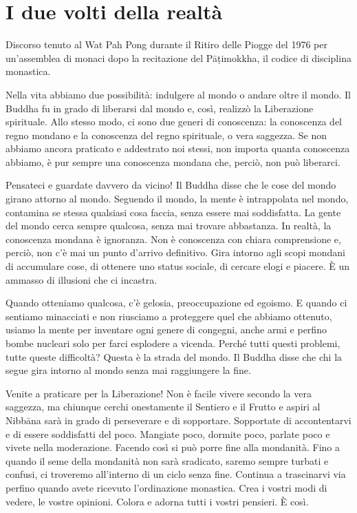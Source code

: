 \chapter{I due volti della realtà}

\begin{openingQuote}
  \centering

  Discorso tenuto al Wat Pah Pong durante il Ritiro delle Piogge del 1976 per
  un'assemblea di monaci dopo la recitazione del Pāṭimokkha, il codice di
  disciplina monastica.
\end{openingQuote}

Nella vita abbiamo due possibilità: indulgere al mondo o andare oltre il
mondo. Il Buddha fu in grado di liberarsi dal mondo e, così, realizzò la
Liberazione spirituale. Allo stesso modo, ci sono due generi di
conoscenza: la conoscenza del regno mondano e la conoscenza del regno
spirituale, o vera saggezza. Se non abbiamo ancora praticato e
addestrato noi stessi, non importa quanta conoscenza abbiamo, è pur
sempre una conoscenza mondana che, perciò, non può liberarci.

Pensateci e guardate davvero da vicino! Il Buddha disse che le cose del
mondo girano attorno al mondo. Seguendo il mondo, la mente è
intrappolata nel mondo, contamina se stessa qualsiasi cosa faccia, senza
essere mai soddisfatta. La gente del mondo cerca sempre qualcosa, senza
mai trovare abbastanza. In realtà, la conoscenza mondana è ignoranza.
Non è conoscenza con chiara comprensione e, perciò, non c'è mai un punto
d'arrivo definitivo. Gira intorno agli scopi mondani di accumulare cose,
di ottenere uno status sociale, di cercare elogi e piacere. È un ammasso
di illusioni che ci incastra.

Quando otteniamo qualcosa, c'è gelosia, preoccupazione ed egoismo. E
quando ci sentiamo minacciati e non riusciamo a proteggere quel che
abbiamo ottenuto, usiamo la mente per inventare ogni genere di congegni,
anche armi e perfino bombe nucleari solo per farci esplodere a vicenda.
Perché tutti questi problemi, tutte queste difficoltà? Questa è la
strada del mondo. Il Buddha disse che chi la segue gira intorno al mondo
senza mai raggiungere la fine.

Venite a praticare per la Liberazione! Non è facile vivere secondo la
vera saggezza, ma chiunque cerchi onestamente il Sentiero e il Frutto e
aspiri al Nibbāna sarà in grado di perseverare e di sopportare.
Sopportate di accontentarvi e di essere soddisfatti del poco. Mangiate
poco, dormite poco, parlate poco e vivete nella moderazione. Facendo
così si può porre fine alla mondanità. Fino a quando il seme della
mondanità non sarà sradicato, saremo sempre turbati e confusi, ci
troveremo all'interno di un ciclo senza fine. Continua a trascinarvi via
perfino quando avete ricevuto l'ordinazione monastica. Crea i vostri
modi di vedere, le vostre opinioni. Colora e adorna tutti i vostri
pensieri. È così.

